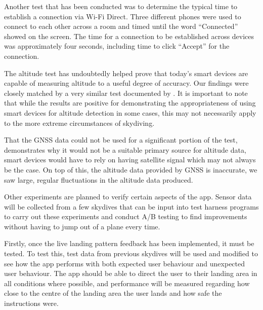 \documentclass[11pt, a4paper, twocolumn]{article}
\begin{document}
Another test that has been conducted was to determine the typical time to establish a connection via Wi-Fi Direct. Three different phones were used to connect to each other across a room and timed until the word ``Connected'' showed on the screen. The time for a connection to be established across devices was approximately four seconds, including time to click ``Accept'' for the connection.

The altitude test has undoubtedly helped prove that today's smart devices are capable of measuring altitude to a useful degree of accuracy. Our findings were closely matched by a very similar test documented by \textcite{he_atmospheric_2012}. It is important to note that while the results are positive for demonstrating the appropriateness of using smart devices for altitude detection in some cases, this may not necessarily apply to the more extreme circumstances of skydiving.

That the GNSS data could not be used for a significant portion of the test, demonstrates why it would not be a suitable primary source for altitude data, smart devices would have to rely on having satellite signal which may not always be the case. On top of this, the altitude data provided by GNSS is inaccurate, we saw large, regular fluctuations in the altitude data produced.

Other experiments are planned to verify certain aspects of the app. Sensor data will be collected from a few skydives that can be input into test harness programs to carry out these experiments and conduct A/B testing to find improvements without having to jump out of a plane every time.

Firstly, once the live landing pattern feedback has been implemented, it must be tested. To test this, test data from previous skydives will be used and modified to see how the app performs with both expected user behaviour and unexpected user behaviour. The app should be able to direct the user to their landing area in all conditions where possible, and performance will be measured regarding how close to the centre of the landing area the user lands and how safe the instructions were.
\end{document}
